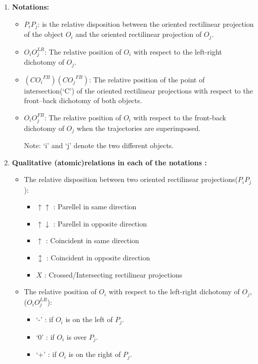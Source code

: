 	\begin{enumerate}
		\item \textbf{Notations:}
		
		\begin{itemize}
			\item $P_iP_j$: is the relative disposition between the oriented rectilinear	projection of the object $O_i$ and the oriented rectilinear projection of $O_j$.
			\item $O_iO_j^{LR}$: The relative position of $O_i$ with respect to the left-right dichotomy of $O_j$.
			\item $({CO_i}^{FB})({CO_j}^{FB})$: The relative position of the point of intersection(`C') of the oriented rectilinear projections with respect to the front–back dichotomy of both objects.
			\item $O_iO_j^{FB}$:  The relative position of $O_i$ with respect to the front-back dichotomy of $O_j$ when the trajectories are superimposed.
			
			Note: `i' and `j' denote the two different objects.
		\end{itemize}
		
		\item \textbf{Qualitative (atomic)relations in each of the notations :}
		\begin{itemize}
			\item The relative disposition between two oriented rectilinear projections($P_iP_j$):
			
			\begin{itemize}
				\item  $\uparrow \uparrow$  : Parellel in same direction
				\item $\uparrow \downarrow$  : Parellel in opposite direction
				\item $\uparrow$  : Coincident in same direction
				\item $\updownarrow$  : Coincident in opposite direction 
				\item $X$  : Crossed/Intersecting rectilinear projections 
			\end{itemize}
		
			\item The relative position of $O_i$ with respect to the left-right
			dichotomy of $O_j$, ($O_iO_j^{LR}$):
			\begin{itemize}
				\item `-' : if $O_i$ is on the left of $P_j$.
				\item `0' : if $O_i$ is over $P_j$.
				\item `+' : if $O_i$ is on the right of $P_j$.
				

\end{itemize}
\end{itemize}
\end{enumerate}
